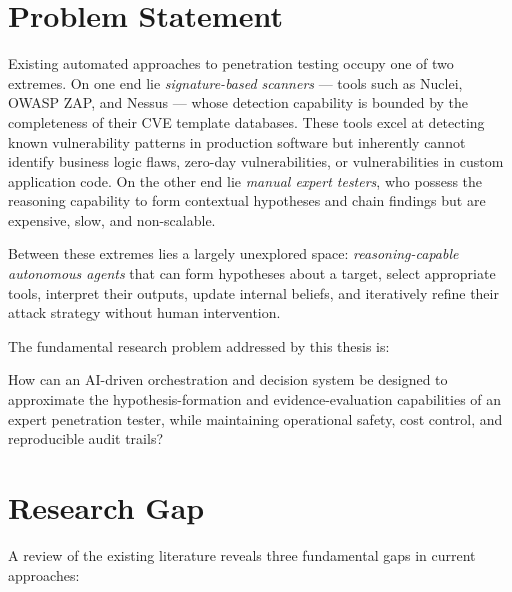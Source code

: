 \documentclass[12pt,a4paper,oneside,openany]{book}
\newcommand{\term}[1]{\textit{#1}}
\begin{document}
\section{Problem Statement}

Existing automated approaches to penetration testing occupy one of two extremes. On one end lie \term{signature-based scanners} — tools such as Nuclei, OWASP ZAP, and Nessus — whose detection capability is bounded by the completeness of their CVE template databases. These tools excel at detecting known vulnerability patterns in production software but inherently cannot identify business logic flaws, zero-day vulnerabilities, or vulnerabilities in custom application code. On the other end lie \term{manual expert testers}, who possess the reasoning capability to form contextual hypotheses and chain findings but are expensive, slow, and non-scalable.

Between these extremes lies a largely unexplored space: \term{reasoning-capable autonomous agents} that can form hypotheses about a target, select appropriate tools, interpret their outputs, update internal beliefs, and iteratively refine their attack strategy without human intervention.

The fundamental research problem addressed by this thesis is:

\begin{researchbox}
How can an AI-driven orchestration and decision system be designed to approximate the hypothesis-formation and evidence-evaluation capabilities of an expert penetration tester, while maintaining operational safety, cost control, and reproducible audit trails?
\end{researchbox}

\section{Research Gap}

A review of the existing literature reveals three fundamental gaps in current approaches:
\end{document}
